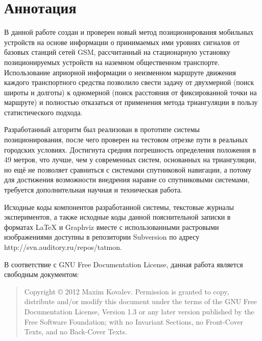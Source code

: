 
\chapter*{Аннотация}

В данной работе создан и проверен новый метод позиционирования мобильных устройств на основе информации о принимаемых ими уровнях сигналов от базовых станций сетей GSM, рассчитанный на стационарную установку позиционируемых устройств на наземном общественном транспорте. Использование априорной информации о неизменном маршруте движения каждого транспортного средства позволило свести задачу от двухмерной (поиск широты и долготы) к одномерной (поиск расстояния от фиксированной точки на маршруте) и полностью отказаться от применения метода триангуляции в пользу статистического подхода.

Разработанный алгоритм был реализован в прототипе системы позиционирования, после чего проверен на тестовом отрезке пути в реальных городских условиях. Достигнута средняя погрешность определения положения в 49 метров, что лучше, чем у современных систем, основанных на триангуляции, но ещё не позволяет сравниться с системами спутниковой навигации, а потому для достижения возможности внедрения наравне со спутниковыми системами, требуется дополнительная научная и техническая работа.

Исходные коды компонентов разработанной системы, текстовые журналы экспериментов, а также исходные коды данной пояснительной записки в форматах \LaTeX{} и Graphviz вместе с использованными растровыми изображениями доступны в репозитории Subversion по адресу http://svn.auditory.ru/repos/tatmon.

В соответствие с GNU Free Documentation License\cite{gnufdl}, данная работа является свободным документом:
\bigskip
\begin{quote}
    Copyright \copyright{}  2012  Maxim Kovalev.
    Permission is granted to copy, distribute and/or modify this document
    under the terms of the GNU Free Documentation License, Version 1.3
    or any later version published by the Free Software Foundation;
    with no Invariant Sections, no Front-Cover Texts, and no Back-Cover Texts.
\end{quote}
\bigskip

